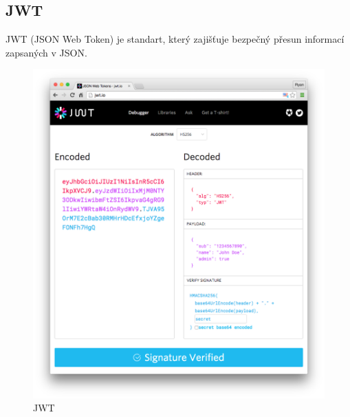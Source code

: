 \documentclass[thesis=B,czech]{FITthesis}[2012/06/26]
\begin{document}
        \subsection{JWT} \label{jwt}
            JWT (JSON Web Token) je standart, který zajišťuje bezpečný přesun informací zapsaných v JSON.
            \begin{figure}[h!]
                \includegraphics[width=\linewidth]{legacy-app-auth-5} 
                \caption{JWT \cite{jwtImage}}
            \end{figure}
            
\end{document}
